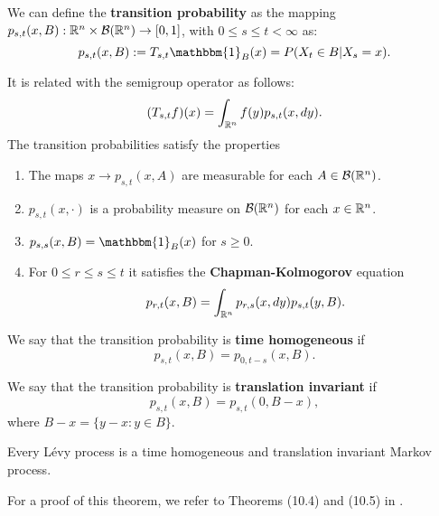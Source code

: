 \begin{Definition}\label{trans_prob}
We can define the \textbf{transition probability} as the mapping $p_{s,t}(x,B) : \mathbb{R}^n \times \mathcal{B}(\mathbb{R}^n) \to [0,1]$, 
with $0\leq s \leq t < \infty$ as: 
\begin{equation}
 p_{s,t}(x,B) := T_{s,t} \mathbbm{1}_B(x) = P(X_t \in B | X_s=x).
\end{equation}
\end{Definition}
It is related with the semigroup operator as follows:
\begin{equation}\label{evolution}
 (T_{s,t}f)(x) = \int_{\mathbb{R}^n} f(y) p_{s,t}(x,dy). 
\end{equation}
The transition probabilities satisfy the properties
 \begin{enumerate}
  \item The maps $x \to p_{s,t}(x,A)$ are measurable for each $A\in \mathcal{B}(\mathbb{R}^n)$.
  \item $p_{s,t}(x,\cdot)$ is a probability measure on $\mathcal{B}(\mathbb{R}^n)$ for each $x \in \mathbb{R}^n$.
  \item $p_{s,s}(x,B) = \mathbbm{1}_B(x)$ for $s \geq 0$. 
  \item For $0\leq r \leq s \leq t$ it satisfies the \textbf{Chapman-Kolmogorov} equation
  \begin{equation}
   p_{r,t}(x,B) = \int_{\mathbb{R}^n} p_{r,s}(x,dy) p_{s,t}(y,B). 
  \end{equation}  
 \end{enumerate}

\begin{Definition}\label{time-homogeneous}
We say that the transition probability is \textbf{time homogeneous} if 
\begin{equation}
 p_{s,t}(x,B) = p_{0,t-s}(x,B).
\end{equation}
\end{Definition}
\begin{Definition}
We say that the transition probability is \textbf{translation invariant} if 
\begin{equation}
 p_{s,t}(x,B) = p_{s,t}(0,B-x),
\end{equation}
where $B-x = \{y-x : y\in B \}$.
\end{Definition}

\begin{Theorem}
Every Lévy process is a time homogeneous and translation invariant Markov process.
\end{Theorem}
For a proof of this theorem, we refer to Theorems (10.4) and (10.5) in \cite{Sato}.\\

